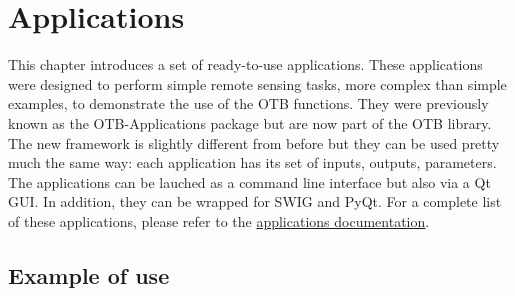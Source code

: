 \chapter{Applications}
\label{sec:Applications}

This chapter introduces a set of ready-to-use applications. 
These applications were designed to perform  simple remote sensing tasks, 
more complex than simple examples, to demonstrate the use of the OTB 
functions. They were previously known as the OTB-Applications 
package but are now part of the OTB library. The new framework is 
slightly different from before but they can be used pretty much the 
same way: each application has its set of inputs, outputs, parameters. 
The applications can be lauched as a command line interface but also
via a Qt GUI. In addition, they can be wrapped for SWIG and PyQt. For a 
complete list of these applications, please refer to the 
\href{http://orfeo-toolbox.org/Applications}{applications documentation}.

\section{Example of use}
\label{sec:appExample}
